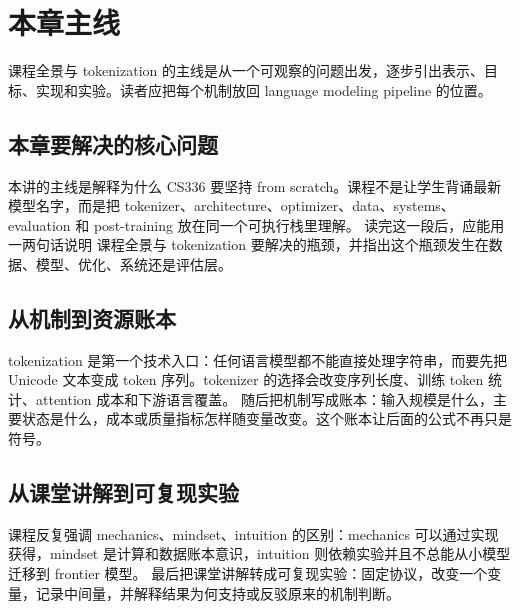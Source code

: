 \documentclass[a4paper]{article}
\begin{document}
\section{本章主线}
课程全景与 tokenization 的主线是从一个可观察的问题出发，逐步引出表示、目标、实现和实验。读者应把每个机制放回 language modeling pipeline 的位置。
\subsection{本章要解决的核心问题}
本讲的主线是解释为什么 CS336 要坚持 from scratch。课程不是让学生背诵最新模型名字，而是把 tokenizer、architecture、optimizer、data、systems、evaluation 和 post-training 放在同一个可执行栈里理解。
读完这一段后，应能用一两句话说明 课程全景与 tokenization 要解决的瓶颈，并指出这个瓶颈发生在数据、模型、优化、系统还是评估层。
\subsection{从机制到资源账本}
tokenization 是第一个技术入口：任何语言模型都不能直接处理字符串，而要先把 Unicode 文本变成 token 序列。tokenizer 的选择会改变序列长度、训练 token 统计、attention 成本和下游语言覆盖。
随后把机制写成账本：输入规模是什么，主要状态是什么，成本或质量指标怎样随变量改变。这个账本让后面的公式不再只是符号。
\subsection{从课堂讲解到可复现实验}
课程反复强调 mechanics、mindset、intuition 的区别：mechanics 可以通过实现获得，mindset 是计算和数据账本意识，intuition 则依赖实验并且不总能从小模型迁移到 frontier 模型。
最后把课堂讲解转成可复现实验：固定协议，改变一个变量，记录中间量，并解释结果为何支持或反驳原来的机制判断。
\end{document}
